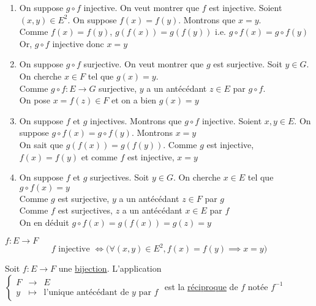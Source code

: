 \begin{prv}
	\begin{enumerate}
		\item On suppose $g \circ f$ injective. On veut montrer que $f$ est injective. Soient $(x,y)\in E^2$. On suppose $f(x)= f(y)$. Montrons que $x=y$.\\
			Comme $f(x) = f(y)$, $g(f(x)) = g(f(y))$ i.e.  $g \circ f(x) = g \circ f(y)$\\
			Or, $g \circ f$ injective donc $x = y$ 
		\item On suppose $g \circ f$ surjective. On veut montrer que $g$ est surjective. Soit $y \in G$. On cherche $x \in F$ tel que $g(x) = y$.\\
			Comme $g \circ f: E\to G$ surjective, $y$ a un antécédant $z \in E$ par $g \circ f$.\\
			On pose $x = f(z) \in F$ et on a bien $g(x) = y$ 
		\item On suppose $f$ et $g$ injectives. Montrons que $g \circ f$ injective. Soient $x,y \in E$. On suppose $g \circ f(x) = g \circ f(y)$. Montrons $x = y$\\
			On sait que  $g(f(x)) = g(f(y))$. Comme $g$ est injective, $f(x) = f(y)$ et comme  $f$ est injective, $x = y$
		\item On suppose  $f$ et $g$ surjectives. Soit $y \in G$. On cherche $x \in E$ tel que $g \circ f(x) = y$\\
			Comme $g$ est surjective, $y$ a un antécédant $z \in F$ par $g$ \\
			Comme $f$ est surjectives, $z$ a un antécédant $x \in E$ par $f$ \\
			On en déduit $g \circ f(x) = g(f(x)) = g(z) = y$
	\end{enumerate}
\end{prv}

\begin{rmk}
	$f: E \longrightarrow F$  \[
		f \text{ injective } \iff \bigg( \forall (x,y) \in E^2, f(x) = f(y) \implies x = y \bigg) 
	\] 
\end{rmk}

\begin{defn}
	Soit $f: E\to F$ une \underline{bijection}.
	L'application $\left\{\begin{array}{rcl}
			F &\longrightarrow& E \\
			y &\longmapsto& \text{l'unique antécédant de $y$ par $f$}
	\end{array}\right.$ est la \underline{réciproque} de $f$ notée $f^{-1}$
\end{defn}

